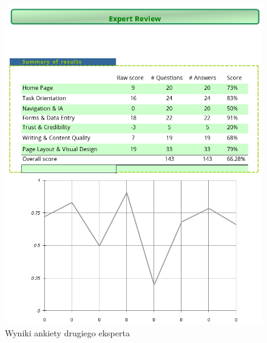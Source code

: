 \documentclass[inzynier,druk]{dyplom}
\begin{document}
\begin{figure}
	\centering\includegraphics[width=\textwidth]{img/ankieta2}
	\caption{Wyniki ankiety drugiego eksperta}\label{rys:ankieta2}%
\end{figure}
\end{document}
